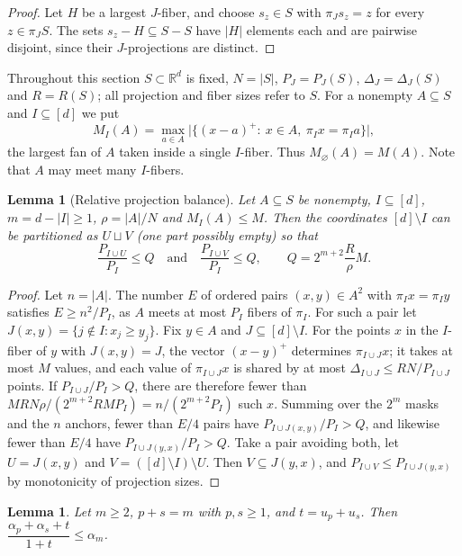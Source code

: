 \documentclass[11pt]{amsart}
\newtheorem{lemma}[theorem]{Lemma}
\theoremstyle{definition}
\theoremstyle{remark}
\newcommand{\R}{\mathbb{R}}
\newcommand{\Mf}{M}
\begin{document}
\begin{proof}
Let $H$ be a largest $J$-fiber, and choose $s_z\in S$ with $\pi_Js_z=z$ for every $z\in\pi_JS$. The sets $s_z-H\subseteq S-S$ have $|H|$ elements each and are pairwise disjoint, since their $J$-projections are distinct.
\end{proof}

Throughout this section $S\subset\R^d$ is fixed, $N=|S|$, $P_J=P_J(S)$, $\Delta_J=\Delta_J(S)$ and $R=R(S)$; all projection and fiber sizes refer to $S$. For a nonempty $A\subseteq S$ and $I\subseteq[d]$ we put
\[
\Mf_I(A)=\max_{a\in A}\big|\{(x-a)^+:\ x\in A,\ \pi_Ix=\pi_Ia\}\big|,
\]
the largest fan of $A$ taken inside a single $I$-fiber. Thus $\Mf_\varnothing(A)=\Mf(A)$. Note that $A$ may meet many $I$-fibers.

\begin{lemma}[Relative projection balance]\label{lem:relbalance}
Let $A\subseteq S$ be nonempty, $I\subseteq[d]$, $m=d-|I|\ge1$, $\rho=|A|/N$ and $\Mf_I(A)\le M$. Then the coordinates $[d]\setminus I$ can be partitioned as $U\sqcup V$ (one part possibly empty) so that
\[
\frac{P_{I\cup U}}{P_I}\le Q\quad\text{and}\quad\frac{P_{I\cup V}}{P_I}\le Q,
\qquad Q=2^{m+2}\frac{R}{\rho}M.
\]
\end{lemma}

\begin{proof}
Let $n=|A|$. The number $E$ of ordered pairs $(x,y)\in A^2$ with $\pi_Ix=\pi_Iy$ satisfies $E\ge n^2/P_I$, as $A$ meets at most $P_I$ fibers of $\pi_I$. For such a pair let $J(x,y)=\{j\notin I:x_j\ge y_j\}$. Fix $y\in A$ and $J\subseteq[d]\setminus I$. For the points $x$ in the $I$-fiber of $y$ with $J(x,y)=J$, the vector $(x-y)^+$ determines $\pi_{I\cup J}x$; it takes at most $M$ values, and each value of $\pi_{I\cup J}x$ is shared by at most $\Delta_{I\cup J}\le RN/P_{I\cup J}$ points. If $P_{I\cup J}/P_I>Q$, there are therefore fewer than $MRN\rho/(2^{m+2}RMP_I)=n/(2^{m+2}P_I)$ such $x$. Summing over the $2^m$ masks and the $n$ anchors, fewer than $E/4$ pairs have $P_{I\cup J(x,y)}/P_I>Q$, and likewise fewer than $E/4$ have $P_{I\cup J(y,x)}/P_I>Q$. Take a pair avoiding both, let $U=J(x,y)$ and $V=([d]\setminus I)\setminus U$. Then $V\subseteq J(y,x)$, and $P_{I\cup V}\le P_{I\cup J(y,x)}$ by monotonicity of projection sizes.
\end{proof}

\begin{lemma}\label{lem:alpha}
Let $m\ge2$, $p+s=m$ with $p,s\ge1$, and $t=u_p+u_s$. Then $\dfrac{\alpha_p+\alpha_s+t}{1+t}\le\alpha_m$.
\end{lemma}
\end{document}
